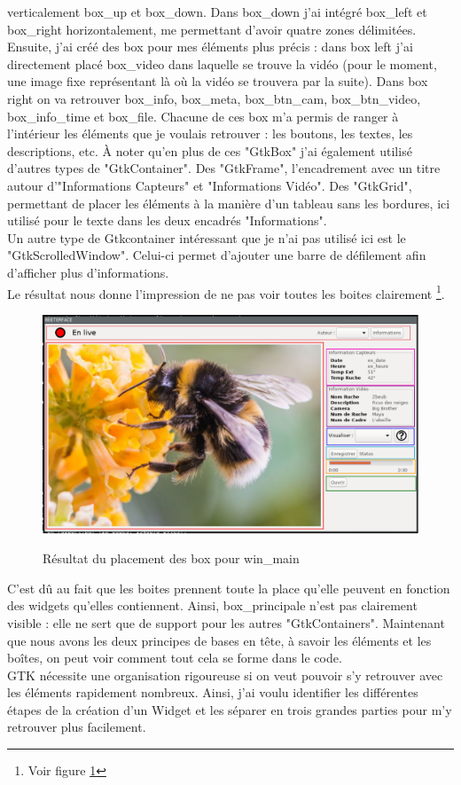 \documentclass[11pt,french,a4paper]{report}
\begin{document}
verticalement box\_up et box\_down. Dans box\_down j'ai intégré box\_left et box\_right horizontalement, me permettant d'avoir 
quatre zones délimitées. \\
Ensuite, j'ai créé des box pour mes éléments plus précis : dans box left j'ai directement placé box\_video dans laquelle 
se trouve la vidéo (pour le moment, une image fixe représentant là où la vidéo se trouvera par la suite). 
Dans box right on va retrouver box\_info, box\_meta, box\_btn\_cam, box\_btn\_video, box\_info\_time et box\_file. 
Chacune de ces box m'a permis de ranger à l'intérieur les éléments que je voulais retrouver : 
les boutons, les textes, les descriptions, etc. 
À noter qu'en plus de ces "GtkBox" j'ai également utilisé d'autres types de "GtkContainer". Des "GtkFrame", l'encadrement
avec un titre autour d'"Informations Capteurs" et "Informations Vidéo". Des "GtkGrid", permettant de placer les éléments 
à la manière d'un tableau sans les bordures, ici utilisé pour le texte dans les deux encadrés "Informations". \\
Un autre type de Gtkcontainer intéressant que je n'ai pas utilisé ici est le "GtkScrolledWindow". Celui-ci permet d'ajouter
une barre de défilement afin d'afficher plus d'informations. \\
Le résultat nous donne l'impression de ne pas voir toutes les boites clairement \footnote{Voir figure \ref{res_box_win_main}}. \\
\begin{figure}[!h]
    \centering
        \includegraphics[scale=0.45]{../images/dia/schema_bloc_win_applique.png} \\
        \caption{Résultat du placement des box pour win\_main}
        \label{res_box_win_main}
\end{figure}
C'est dû au fait que les boites prennent toute la place qu'elle peuvent en fonction des widgets qu'elles contiennent. Ainsi, box\_principale 
n'est pas clairement visible : elle ne sert que de support pour les autres "GtkContainers". 
Maintenant que nous avons les deux principes de bases en tête, à savoir les éléments et les boîtes, on peut voir comment 
tout cela se forme dans le code. \\
GTK nécessite une organisation rigoureuse si on veut pouvoir s'y retrouver avec les éléments rapidement nombreux.
Ainsi, j'ai voulu identifier les différentes étapes de la création d'un Widget et les séparer en 
trois grandes parties pour m'y retrouver plus facilement. \\
\end{document}
